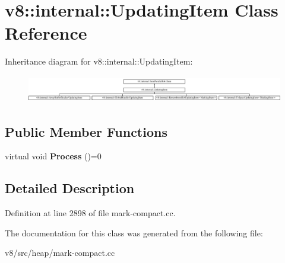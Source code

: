 \hypertarget{classv8_1_1internal_1_1UpdatingItem}{}\section{v8\+:\+:internal\+:\+:Updating\+Item Class Reference}
\label{classv8_1_1internal_1_1UpdatingItem}
Inheritance diagram for v8\+:\+:internal\+:\+:Updating\+Item\+:\begin{figure}[H]
\begin{center}
\leavevmode
\includegraphics[height=1.206897cm]{classv8_1_1internal_1_1UpdatingItem}
\end{center}
\end{figure}
\subsection*{Public Member Functions}
\begin{DoxyCompactItemize}
\item 
\mbox{\label{classv8_1_1internal_1_1UpdatingItem_ad5b054dd403a93d6b2397ba52d42c136}} 
virtual void {\bfseries Process} ()=0
\end{DoxyCompactItemize}


\subsection{Detailed Description}


Definition at line 2898 of file mark-\/compact.\+cc.



The documentation for this class was generated from the following file\+:\begin{DoxyCompactItemize}
\item 
v8/src/heap/mark-\/compact.\+cc\end{DoxyCompactItemize}
